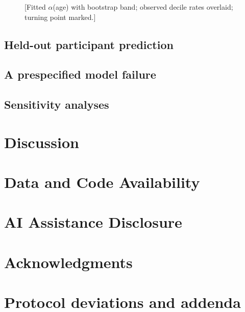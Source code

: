 \documentclass[11pt]{article}
\newcommand{\alphaw}{\ensuremath{\alpha}}                 %
\newcommand{\repo}{\url{https://github.com/francislinlfh-lgtm/Aspire-Project}}
\begin{document}
\begin{figure}[tb]
  \centering
  \caption{[Fitted \alphaw(age) with bootstrap band; observed decile rates
  overlaid; turning point marked.]}
  \label{fig:curve}
\end{figure}

\subsection{Held-out participant prediction}\label{sec:cv}
\subsection{A prespecified model failure}\label{sec:t2}
\subsection{Sensitivity analyses}\label{sec:sensitivity}

\section{Discussion}\label{sec:discussion}

\section*{Data and Code Availability}

\section*{AI Assistance Disclosure}

\section*{Acknowledgments}




\appendix
\section{Protocol deviations and addenda}\label{app:addenda}
\end{document}

